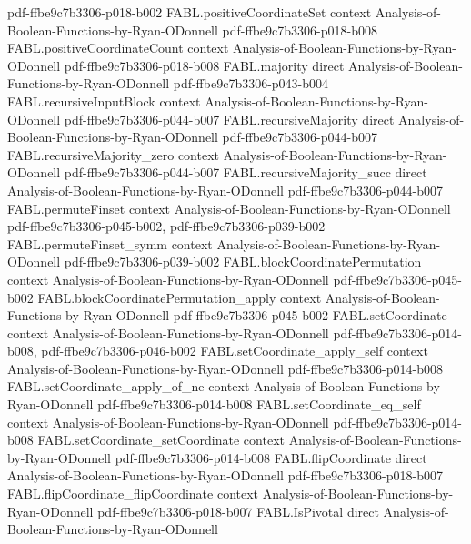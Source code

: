 \begin{theorem}
  {pdf-ffbe9c7b3306-p018-b002}
\proofstep
  {FABL.positiveCoordinateSet}
  {context}
  {Analysis-of-Boolean-Functions-by-Ryan-ODonnell}
  {pdf-ffbe9c7b3306-p018-b008}
\proofstep
  {FABL.positiveCoordinateCount}
  {context}
  {Analysis-of-Boolean-Functions-by-Ryan-ODonnell}
  {pdf-ffbe9c7b3306-p018-b008}
\proofstep
  {FABL.majority}
  {direct}
  {Analysis-of-Boolean-Functions-by-Ryan-ODonnell}
  {pdf-ffbe9c7b3306-p043-b004}
\proofstep
  {FABL.recursiveInputBlock}
  {context}
  {Analysis-of-Boolean-Functions-by-Ryan-ODonnell}
  {pdf-ffbe9c7b3306-p044-b007}
\proofstep
  {FABL.recursiveMajority}
  {direct}
  {Analysis-of-Boolean-Functions-by-Ryan-ODonnell}
  {pdf-ffbe9c7b3306-p044-b007}
\proofstep
  {FABL.recursiveMajority_zero}
  {context}
  {Analysis-of-Boolean-Functions-by-Ryan-ODonnell}
  {pdf-ffbe9c7b3306-p044-b007}
\proofstep
  {FABL.recursiveMajority_succ}
  {direct}
  {Analysis-of-Boolean-Functions-by-Ryan-ODonnell}
  {pdf-ffbe9c7b3306-p044-b007}
\proofstep
  {FABL.permuteFinset}
  {context}
  {Analysis-of-Boolean-Functions-by-Ryan-ODonnell}
  {pdf-ffbe9c7b3306-p045-b002,
    pdf-ffbe9c7b3306-p039-b002}
\proofstep
  {FABL.permuteFinset_symm}
  {context}
  {Analysis-of-Boolean-Functions-by-Ryan-ODonnell}
  {pdf-ffbe9c7b3306-p039-b002}
\proofstep
  {FABL.blockCoordinatePermutation}
  {context}
  {Analysis-of-Boolean-Functions-by-Ryan-ODonnell}
  {pdf-ffbe9c7b3306-p045-b002}
\proofstep
  {FABL.blockCoordinatePermutation_apply}
  {context}
  {Analysis-of-Boolean-Functions-by-Ryan-ODonnell}
  {pdf-ffbe9c7b3306-p045-b002}
\proofstep
  {FABL.setCoordinate}
  {context}
  {Analysis-of-Boolean-Functions-by-Ryan-ODonnell}
  {pdf-ffbe9c7b3306-p014-b008,
    pdf-ffbe9c7b3306-p046-b002}
\proofstep
  {FABL.setCoordinate_apply_self}
  {context}
  {Analysis-of-Boolean-Functions-by-Ryan-ODonnell}
  {pdf-ffbe9c7b3306-p014-b008}
\proofstep
  {FABL.setCoordinate_apply_of_ne}
  {context}
  {Analysis-of-Boolean-Functions-by-Ryan-ODonnell}
  {pdf-ffbe9c7b3306-p014-b008}
\proofstep
  {FABL.setCoordinate_eq_self}
  {context}
  {Analysis-of-Boolean-Functions-by-Ryan-ODonnell}
  {pdf-ffbe9c7b3306-p014-b008}
\proofstep
  {FABL.setCoordinate_setCoordinate}
  {context}
  {Analysis-of-Boolean-Functions-by-Ryan-ODonnell}
  {pdf-ffbe9c7b3306-p014-b008}
\proofstep
  {FABL.flipCoordinate}
  {direct}
  {Analysis-of-Boolean-Functions-by-Ryan-ODonnell}
  {pdf-ffbe9c7b3306-p018-b007}
\proofstep
  {FABL.flipCoordinate_flipCoordinate}
  {context}
  {Analysis-of-Boolean-Functions-by-Ryan-ODonnell}
  {pdf-ffbe9c7b3306-p018-b007}
\proofstep
  {FABL.IsPivotal}
  {direct}
  {Analysis-of-Boolean-Functions-by-Ryan-ODonnell}

\end{theorem}
